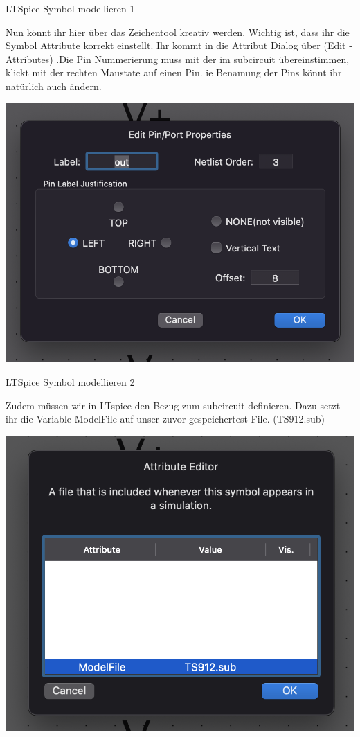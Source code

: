\begin{frame}[t]{LTSpice Symbol modellieren 1} 

    Nun könnt ihr hier über das Zeichentool kreativ werden.
    Wichtig ist, dass ihr die Symbol Attribute korrekt einstellt. Ihr kommt in
    die Attribut Dialog über (Edit -\> Attributes) .Die Pin Nummerierung muss 
    mit der im subcircuit übereinstimmen, klickt mit der rechten Maustate auf einen Pin.
    ie Benamung der Pins könnt ihr natürlich auch ändern.

    \begin{spacing}{0.9} \begin{tiny}
        \begin{minipage}{\textwidth}
          \includegraphics[width=0.6\linewidth]{pictures/pinNummerierung.png}
        \end{minipage}
    \end{tiny} \end{spacing}

\end{frame}


\begin{frame}[t]{LTSpice Symbol modellieren 2} 

    Zudem müssen wir in LTspice den Bezug zum subcircuit definieren. Dazu setzt ihr die
    Variable ModelFile auf unser zuvor gespeichertest File. (TS912.sub)

    \begin{spacing}{0.9} \begin{tiny}
        \begin{minipage}{\textwidth}
          \includegraphics[width=0.6\linewidth]{pictures/spiceModel.png}
        \end{minipage}
    \end{tiny} \end{spacing}

\end{frame}

